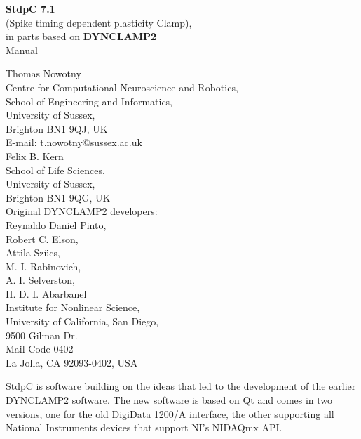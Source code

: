\documentclass{article}
\begin{document}
\begin{titlepage}
  \begin{center}
  {{\bf \Large 
    StdpC 7.1 }\\[0.3cm]
    \large (Spike timing dependent plasticity Clamp)}, \\[1cm]
  {\large 
    in parts based on {\bf DYNCLAMP2} \cite{Pinto2001} 
  } \\[2cm]
  {\sc \Large Manual }
  \end{center}
\vspace*{2cm}

\noindent
{\large Thomas Nowotny} \\[0.5cm]
Centre for Computational Neuroscience and Robotics, \\
School of Engineering and Informatics, \\
University of Sussex, \\
Brighton BN1 9QJ, UK \\
E-mail: t.nowotny@sussex.ac.uk
 \\[1cm]
{\large Felix B. Kern} \\[0.5cm]
School of Life Sciences, \\
University of Sussex, \\
Brighton BN1 9QG, UK
 \\[1cm]
Original DYNCLAMP2 developers: \\[0.2cm]
Reynaldo Daniel Pinto, \\
Robert C. Elson, \\
Attila Sz\"ucs, \\
M. I. Rabinovich, \\
A. I. Selverston,  \\
H. D. I. Abarbanel \\[0.5cm]
Institute for Nonlinear Science, \\
University of California, San Diego, \\
9500 Gilman Dr. \\ Mail Code 0402 \\
La Jolla, CA 92093-0402, USA \\

\end{titlepage}

StdpC is software building on the ideas that led
to the development of the earlier DYNCLAMP2
software. The new software is based on Qt and comes in two versions, one
for the old DigiData 1200/A interface, the other supporting all National
Instruments devices that support NI's NIDAQmx API.
 
\end{document}
